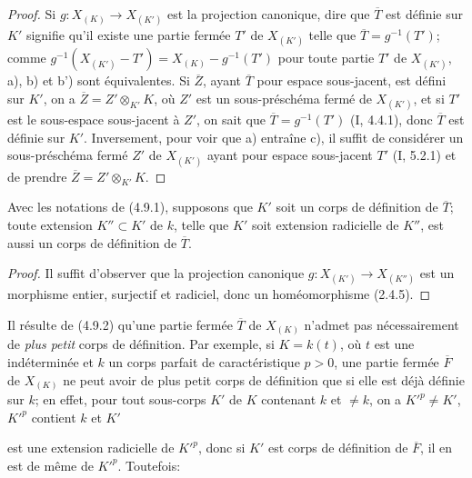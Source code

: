 \begin{proof}
Si $g:X_{(K)}\to X_{(K')}$ est la projection canonique, dire que
$\overline T$ est définie sur $K'$ signifie qu'il existe une partie fermée
$T'$ de $X_{(K')}$ telle que $\overline T=g^{-1}(T')$; comme
$g^{-1}(X_{(K')}-T')=X_{(K)}-g^{-1}(T')$ pour toute partie $T'$ de
$X_{(K')}$, a), b) et b') sont équivalentes. Si $\overline Z$, ayant
$\overline T$ pour espace sous-jacent, est défini sur $K'$, on a
$\overline Z=Z'\otimes_{K'}K$, où $Z'$ est un sous-préschéma fermé de
$X_{(K')}$, et si $T'$ est le sous-espace sous-jacent à $Z'$, on sait que
$\overline T=g^{-1}(T')$ (I, 4.4.1), donc $\overline T$ est définie sur
$K'$. Inversement, pour voir que a) entraîne c), il suffit de considérer un
sous-préschéma fermé $Z'$ de $X_{(K')}$ ayant pour espace sous-jacent $T'$
(I, 5.2.1) et de prendre $\overline Z=Z'\otimes_{K'}K$.
\end{proof}

\begin{corollary}[4.9.2]
\label{IV.2.4.9.2-fr}
Avec les notations de (4.9.1), supposons que $K'$ soit un corps de définition
de $\overline T$; toute extension $K''\subset K'$ de $k$, telle que $K'$ soit
extension radicielle de $K''$, est aussi un corps de définition de
$\overline T$.
\end{corollary}

\begin{proof}
Il suffit d'observer que la projection canonique
$g:X_{(K')}\to X_{(K'')}$ est un morphisme entier, surjectif et radiciel,
donc un homéomorphisme (2.4.5).
\end{proof}

\begin{remark}[4.9.3]
\label{IV.2.4.9.3-fr}
Il résulte de (4.9.2) qu'une partie fermée $\overline T$ de $X_{(K)}$ n'admet
pas nécessairement de \emph{plus petit} corps de définition. Par exemple, si
$K=k(t)$, où $t$ est une indéterminée et $k$ un corps parfait de
caractéristique $p>0$, une partie fermée $\overline F$ de $X_{(K)}$ ne peut
avoir de plus petit corps de définition que si elle est déjà définie sur $k$;
en effet, pour tout sous-corps $K'$ de $K$ contenant $k$ et $\ne k$, on a
$K'^p\ne K'$, $K'^p$ contient $k$ et $K'$


est une extension radicielle de $K'^p$, donc si $K'$ est corps de définition
de $\overline F$, il en est de même de $K'^p$. Toutefois:
\end{remark}

